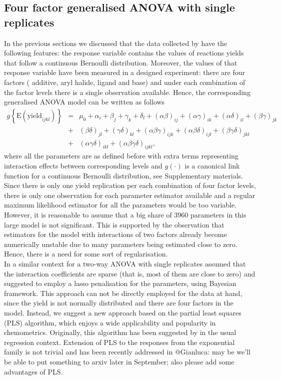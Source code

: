 \documentclass[12pt]{article}
\def\beq{\begin{eqnarray}}
\def\eeq{\end{eqnarray}}
\begin{document}
\subsection{Four factor generalised ANOVA with single replicates}
In the previous sections we discussed that the data collected by \citet{Ahneman2018} have the following features: the response variable contains the values of reactions yields that follow a continuous Bernoulli distribution. Moreover, the values of that response variable have been measured in a designed experiment: there are four factors ({\color{blue} additive, aryl halide, ligand and base}) and under each combination of the factor levels there is a single observation available. Hence, the corresponding generalised ANOVA model can be written as follows
\beq
\label{eq:anovamodel}
g\left\{\mbox{E}(\mbox{yield}_{ijkl})\right\}&=&\mu_0+\alpha_i+\beta_j+\gamma_k+\delta_l+(\alpha\beta)_{ij}+(\alpha\gamma)_{ik}+(\alpha\delta)_{il}+(\beta\gamma)_{jk}\nonumber \\
&+&(\beta\delta)_{jl}+(\gamma\delta)_{kl}+(\alpha\beta\gamma)_{ijk}+(\alpha\beta\delta)_{ijl}+(\beta\gamma\delta)_{jkl}\\
&+&(\alpha\gamma\delta)_{ikl}+(\alpha\beta\gamma\delta)_{ijkl},\nonumber
\eeq
where all the parameters are as defined before with extra terms representing interaction effects between corresponding levels and $g(\cdot)$ is a canonical link function for a continuous Bernoulli distribution, see Supplementary materials. Since there is only one yield replication per each combination of four factor levels, there is only one observation for each parameter estimator available and a regular maximum likelihood estimator for all the parameters would be too variable. However, it is reasonable to assume that a big share of $3960$ parameters in this large model is not significant. This is supported by the observation that estimators for the model with interactions of two factors already become numerically unstable due to many parameters being estimated close to zero. Hence, there is a need for some sort of regularisation.\\
In a similar context for a two-way ANOVA with single replicates \citet{GRIFFIN2019181} assumed that the interaction coefficients are sparse (that is, most of them are close to zero) and suggested to employ a lasso penalisation for the parameters, using Bayesian framework. This approach can not be directly employed for the data at hand, since the yield is not normally distributed and there are four factors in the model. Instead, we suggest a new approach based on the partial least squares (PLS) algorithm, which enjoys a wide applicability and popularity in chemometrics. Originally, this algorithm has been suggested by \citet{Wold66} in the usual regression context. Extension of PLS to the responses from the exponential family is not trivial and has been recently addressed in {\color{red}@Gianluca: may be we'll be able to put something to arxiv later in September; also please add some advantages of PLS}. \\
\end{document}
